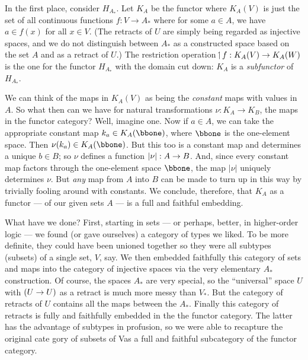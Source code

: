 In the first place, consider $H_{A_*}$. Let $K_A$ be the functor where $K_A(V)$ is just the set of all continuous functions
$f: V\to A_*$ where for some $a \in A$, we have $a \in f(x)$ for all $x \in V$. (The retracts of $U$ are simply being regarded as injective spaces, and we do not distinguish between $A_*$ as a constructed space based on the set $A$ and as a retract of $U$.) The restriction operation
$\!\upharpoonleft\! f : K_A(V)\rightarrow K_A(W)$
is the one for the functor $H_{A_*}$ with the domain cut down: $K_A$ is a {\it subfunctor} of $H_{A_*}$.

We can think of the maps in $K_A(V)$ as being the {\it constant} maps with
values in $A$. So what then can we have for natural transformations $\nu: K_A \to K_B$, the maps in the functor category? Well, imagine one. Now if $a \in A$, we can take the appropriate constant map $k_a \in K_A(\bbone)$, where $\bbone$ is the one-element space. Then $\nu(k_a) \in K_A(\bbone)$.
But this too is a constant map and determines a unique $b \in B$; so $\nu$ defines a function $|\nu| : A \rightarrow B$. And, since every constant map factors through the one-element space $\bbone$, the map $|\nu|$ uniquely determines $\nu$. But {\it any} map from $A$ into $B$ can
be made to turn up in this way by trivially fooling around with constants. We conclude, therefore, that $K_A$ as a functor --- of our given sets $A$ --- is a full and faithful embedding.

What have we done? First, starting in sets --- or perhaps, better, in higher-order logic --- we found (or gave ourselves) a category of types we liked. To be more definite, they could
have been unioned together so they were all subtypes (subsets) of a single set, $V$, say. We then embedded faithfully this category of sets and maps into the category of injective spaces via the very elementary $A_*$ construction. Of course, the spaces $A_*$ are very special, so the ``universal'' space $U$ with $(U\rightarrow U)$ as a retract is much more messy than $V_*$. But the category of retracts of $U$ contains all the maps between the $A_*$. Finally this category of retracts is fully and faithfully embedded in the the functor category. The latter has the advantage of subtypes in profusion, so we were able to recapture the original cate gory of subsets of Vas a full and faithful subcategory of the functor category.

